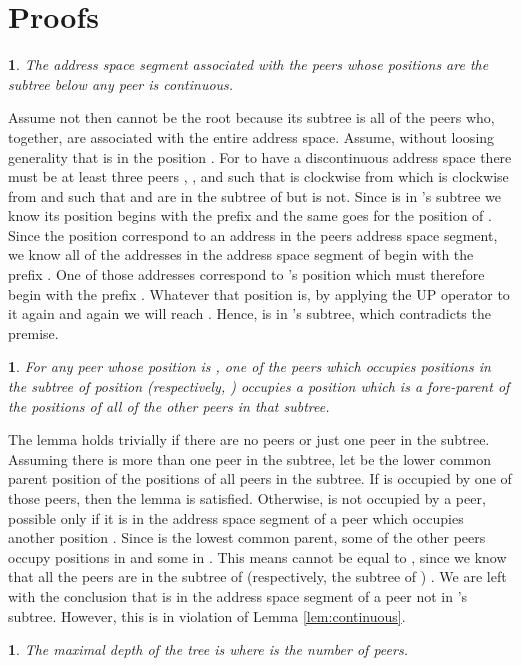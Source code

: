 \documentclass[12pt,english,journal]{elsarticle}
\makeatletter
\numberwithin{equation}{section}
\numberwithin{figure}{section}
\theoremstyle{plain}
\theoremstyle{plain}
\newtheorem{lem}[thm]{\protect\lemmaname}
\newenvironment{proof}[1][\protect\proofname]{\par
\normalfont\topsep6\p@\@plus6\p@\relax
\trivlist
\itemindent\parindent
\item[\hskip\labelsep
\scshape
#1]\ignorespaces
}{\endtrivlist\@endpefalse
}
\providecommand{\proofname}{Proof}
\providecommand{\lemmaname}{Lemma}
\makeatother
\begin{document}
\section{\label{sec:Proofs}Proofs}
\begin{lem}
The address space segment associated with the peers whose positions
are the subtree below any peer  is continuous.\end{lem}
\begin{proof}
Assume not then  cannot be the root because its subtree is
all of the peers who, together, are associated with the entire address
space. Assume, without loosing generality that  is in the
position . For  to have a discontinuous
address space there must be at least three peers , ,
and  such that  is clockwise from  which
is clockwise from  and such that  and 
are in the subtree of  but  is not. Since 
is in 's subtree we know its position  begins with
the prefix  and the same goes for the position  of
. Since the position correspond to an address in the peers
address space segment, we know all of the addresses in the address
space segment of  begin with the prefix . One of those
addresses correspond to 's position  which must
therefore begin with the prefix . Whatever that position is, by
applying the UP operator to it again and again we will reach .
Hence,  is in 's subtree, which contradicts the premise.\end{proof}
\begin{lem}
For any peer  whose position is , one of the peers
which occupies positions in the subtree of position 
(respectively, ) occupies a position which
is a fore-parent of the positions of all of the other peers in that
subtree.
\end{lem}
The lemma holds trivially if there are no peers or just one peer in
the subtree. Assuming there is more than one peer in the subtree,
let  be the lower common parent position of the positions
of all peers in the subtree. If  is occupied by one of those
peers, then the lemma is satisfied. Otherwise,  is not occupied
by a peer, possible only if it is in the address space segment of
a peer  which occupies another position . Since
 is the lowest common parent, some of the other peers occupy
positions in  and some in .
This means  cannot be equal to , since we know that
all the peers are in the subtree of  (respectively,
the subtree of ) . We are left with the
conclusion that  is in the address space segment of a peer
not in 's subtree. However, this is in violation of Lemma
\ref{lem:continuous}.
\begin{lem}
The maximal depth of the tree is  where 
is the number of peers.\end{lem}
\end{document}
